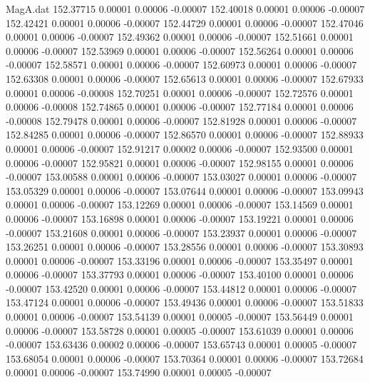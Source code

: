 \begin{filecontents}{MagA.dat}
 152.37715    0.00001    0.00006   -0.00007
 152.40018    0.00001    0.00006   -0.00007
 152.42421    0.00001    0.00006   -0.00007
 152.44729    0.00001    0.00006   -0.00007
 152.47046    0.00001    0.00006   -0.00007
 152.49362    0.00001    0.00006   -0.00007
 152.51661    0.00001    0.00006   -0.00007
 152.53969    0.00001    0.00006   -0.00007
 152.56264    0.00001    0.00006   -0.00007
 152.58571    0.00001    0.00006   -0.00007
 152.60973    0.00001    0.00006   -0.00007
 152.63308    0.00001    0.00006   -0.00007
 152.65613    0.00001    0.00006   -0.00007
 152.67933    0.00001    0.00006   -0.00008
 152.70251    0.00001    0.00006   -0.00007
 152.72576    0.00001    0.00006   -0.00008
 152.74865    0.00001    0.00006   -0.00007
 152.77184    0.00001    0.00006   -0.00008
 152.79478    0.00001    0.00006   -0.00007
 152.81928    0.00001    0.00006   -0.00007
 152.84285    0.00001    0.00006   -0.00007
 152.86570    0.00001    0.00006   -0.00007
 152.88933    0.00001    0.00006   -0.00007
 152.91217    0.00002    0.00006   -0.00007
 152.93500    0.00001    0.00006   -0.00007
 152.95821    0.00001    0.00006   -0.00007
 152.98155    0.00001    0.00006   -0.00007
 153.00588    0.00001    0.00006   -0.00007
 153.03027    0.00001    0.00006   -0.00007
 153.05329    0.00001    0.00006   -0.00007
 153.07644    0.00001    0.00006   -0.00007
 153.09943    0.00001    0.00006   -0.00007
 153.12269    0.00001    0.00006   -0.00007
 153.14569    0.00001    0.00006   -0.00007
 153.16898    0.00001    0.00006   -0.00007
 153.19221    0.00001    0.00006   -0.00007
 153.21608    0.00001    0.00006   -0.00007
 153.23937    0.00001    0.00006   -0.00007
 153.26251    0.00001    0.00006   -0.00007
 153.28556    0.00001    0.00006   -0.00007
 153.30893    0.00001    0.00006   -0.00007
 153.33196    0.00001    0.00006   -0.00007
 153.35497    0.00001    0.00006   -0.00007
 153.37793    0.00001    0.00006   -0.00007
 153.40100    0.00001    0.00006   -0.00007
 153.42520    0.00001    0.00006   -0.00007
 153.44812    0.00001    0.00006   -0.00007
 153.47124    0.00001    0.00006   -0.00007
 153.49436    0.00001    0.00006   -0.00007
 153.51833    0.00001    0.00006   -0.00007
 153.54139    0.00001    0.00005   -0.00007
 153.56449    0.00001    0.00006   -0.00007
 153.58728    0.00001    0.00005   -0.00007
 153.61039    0.00001    0.00006   -0.00007
 153.63436    0.00002    0.00006   -0.00007
 153.65743    0.00001    0.00005   -0.00007
 153.68054    0.00001    0.00006   -0.00007
 153.70364    0.00001    0.00006   -0.00007
 153.72684    0.00001    0.00006   -0.00007
 153.74990    0.00001    0.00005   -0.00007

\end{filecontents}
